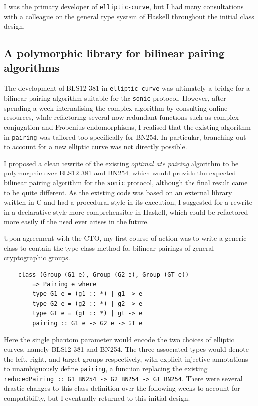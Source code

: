 \documentclass[11pt]{article}
\begin{document}
I was the primary developer of \texttt{elliptic-curve}, but I had many consultations with a colleague on the general type system of Haskell throughout the initial class design.

\pagebreak

\subsection{A polymorphic library for bilinear pairing algorithms}

The development of BLS12-381 in \texttt{elliptic-curve} was ultimately a bridge for a bilinear pairing algorithm suitable for the \texttt{sonic} protocol. However, after spending a week internalising the complex algorithm by consulting online resources, while refactoring several now redundant functions such as complex conjugation and Frobenius endomorphisms, I realised that the existing algorithm in \texttt{pairing} was tailored too specifically for BN254. In particular, branching out to account for a new elliptic curve was not directly possible.

I proposed a clean rewrite of the existing \emph{optimal ate pairing} algorithm \cite{beuchat} to be polymorphic over BLS12-381 and BN254, which would provide the expected bilinear pairing algorithm for the \texttt{sonic} protocol, although the final result came to be quite different. As the existing code was based on an external library written in C and had a procedural style in its execution, I suggested for a rewrite in a declarative style more comprehensible in Haskell, which could be refactored more easily if the need ever arises in the future.

Upon agreement with the CTO, my first course of action was to write a generic class to contain the type class method for bilinear pairings of general cryptographic groups.
\begin{verbatim}
    class (Group (G1 e), Group (G2 e), Group (GT e))
        => Pairing e where
        type G1 e = (g1 :: *) | g1 -> e
        type G2 e = (g2 :: *) | g2 -> e
        type GT e = (gt :: *) | gt -> e
        pairing :: G1 e -> G2 e -> GT e
\end{verbatim}
Here the single phantom parameter would encode the two choices of elliptic curves, namely BLS12-381 and BN254. The three associated types would denote the left, right, and target groups respectively, with explicit injective annotations to unambiguously define \texttt{pairing}, a function replacing the existing \texttt{reducedPairing :: G1 BN254 -> G2 BN254 -> GT BN254}. There were several drastic changes to this class definition over the following weeks to account for compatibility, but I eventually returned to this initial design.
\end{document}
